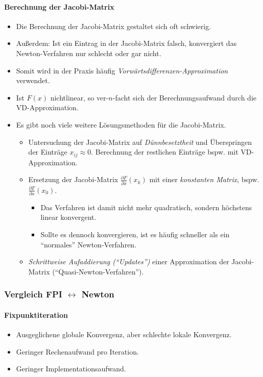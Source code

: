 				\paragraph{Berechnung der Jacobi-Matrix} %
					\begin{itemize}
						\item Die Berechnung der Jacobi-Matrix gestaltet sich oft schwierig.
						\item Außerdem: Ist ein Eintrag in der Jacobi-Matrix falsch, konvergiert das Newton-Verfahren nur schlecht oder gar nicht.
						\item Somit wird in der Praxis häufig \textit{Vorwärtsdifferenzen-Approximation} verwendet.
						\item Ist \( F(x) \) nichtlinear, so ver-\(n\)-facht sich der Berechnungsaufwand durch die VD-Approximation.
						\item Es gibt noch viele weitere Lösungsmethoden für die Jacobi-Matrix.
							\begin{itemize}
								\item Untersuchung der Jacobi-Matrix auf \textit{Dünnbesetztheit} und Überspringen der Einträge \( x _ {ij} \approx 0 \). Berechnung der restlichen Einträge bspw. mit VD-Approximation.
								\item Ersetzung der Jacobi-Matrix \( \frac{\partial F}{\partial x} (x _ k) \) mit einer \textit{konstanten Matrix}, bspw. \( \frac{\partial F}{\partial x} (x _ 0) \).
										\begin{itemize}
											\item Das Verfahren ist damit nicht mehr quadratisch, sondern höchstens linear konvergent.
											\item Sollte es dennoch konvergieren, ist es häufig schneller als ein \enquote{normales} Newton-Verfahren.
										\end{itemize}
								\item \textit{Schrittweise Aufaddierung (\enquote{Updates})} einer Approximation der Jacobi-Matrix (\enquote{Quasi-Newton-Verfahren}).
							\end{itemize}
					\end{itemize}

			\subsubsection{Vergleich FPI \( \leftrightarrow \) Newton} %
				\paragraph{Fixpunktiteration}
					\begin{itemize}
						\item Ausgeglichene globale Konvergenz, aber schlechte lokale Konvergenz.
						\item Geringer Rechenaufwand pro Iteration.
						\item Geringer Implementationsaufwand.
					\end{itemize}

